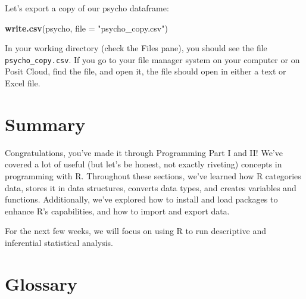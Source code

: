 \documentclass[
]{book}
\newenvironment{Shaded}{\begin{snugshade}}{\end{snugshade}}
\newcommand{\AttributeTok}[1]{\textcolor[rgb]{0.13,0.29,0.53}{#1}}
\newcommand{\FunctionTok}[1]{\textcolor[rgb]{0.13,0.29,0.53}{\textbf{#1}}}
\newcommand{\NormalTok}[1]{#1}
\newcommand{\StringTok}[1]{\textcolor[rgb]{0.31,0.60,0.02}{#1}}
\begin{document}
Let's export a copy of our psycho dataframe:

\begin{Shaded}
\begin{Highlighting}[]
\FunctionTok{write.csv}\NormalTok{(psycho, }\AttributeTok{file =} \StringTok{"psycho\_copy.csv"}\NormalTok{)}
\end{Highlighting}
\end{Shaded}

In your working directory (check the Files pane), you should see the file \texttt{psycho\_copy.csv}. If you go to your file manager system on your computer or on Posit Cloud, find the file, and open it, the file should open in either a text or Excel file.

\section{Summary}\label{summary-3}

Congratulations, you've made it through Programming Part I and II! We've covered a lot of useful (but let's be honest, not exactly riveting) concepts in programming with R. Throughout these sections, we've learned how R categories data, stores it in data structures, converts data types, and creates variables and functions. Additionally, we've explored how to install and load packages to enhance R's capabilities, and how to import and export data.

For the next few weeks, we will focus on using R to run descriptive and inferential statistical analysis.

\section{Glossary}\label{glossary-2}
\end{document}
